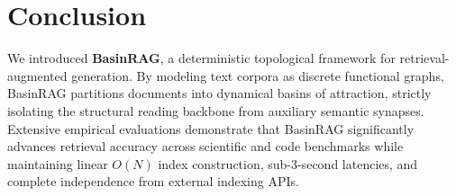 \documentclass[10pt,twocolumn]{article}
\theoremstyle{definition}
\begin{document}
\section{Conclusion}

We introduced \textbf{BasinRAG}, a deterministic topological framework for retrieval-augmented generation. By modeling text corpora as discrete functional graphs, BasinRAG partitions documents into dynamical basins of attraction, strictly isolating the structural reading backbone from auxiliary semantic synapses. Extensive empirical evaluations demonstrate that BasinRAG significantly advances retrieval accuracy across scientific and code benchmarks while maintaining linear $O(N)$ index construction, sub-3-second latencies, and complete independence from external indexing APIs.

\balance

\end{document}

